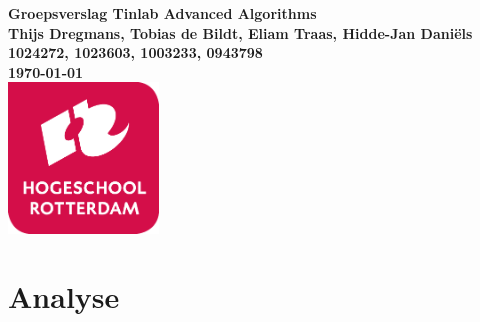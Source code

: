 \documentclass{article}
\begin{document}
	\sffamily
	
	\begin{titlepage}
	
		\centering
		  \vfill
		  {\bfseries\Huge
		    Groepsverslag Tinlab Advanced Algorithms \\
		      \vskip2cm
		    }
		    {\bfseries\Large
		      Thijs Dregmans, Tobias de Bildt, Eliam Traas, Hidde-Jan Daniëls\\
		    }
		    {
		      \bfseries\normalsize
		      1024272, 1023603, 1003233, 0943798\\
		      \vskip1cm
		      \today\\
		  }    
		  \vfill
		  \includegraphics[width=4cm]{logohr.png} %
		  \vfill
		  \vfill
	    
	\end{titlepage}
	
	\newpage
	
	
	\tableofcontents
	
	\newpage

	
	\section{Analyse}
	
\end{document}
